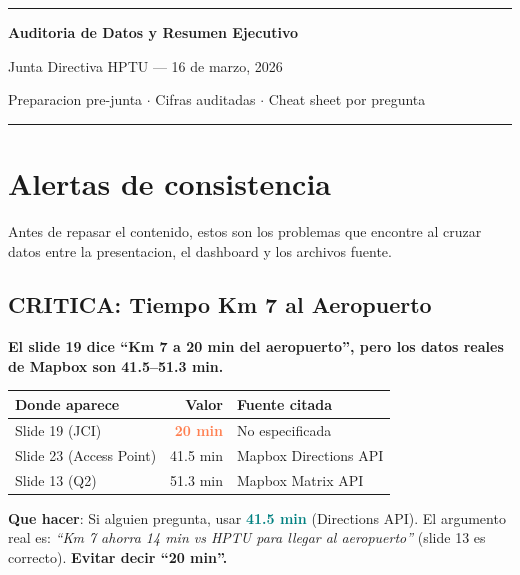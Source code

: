 \documentclass[11pt, a4paper]{article}
\newcommand{\hl}[1]{\textcolor{teal}{\textbf{#1}}}
\newcommand{\dg}[1]{\textcolor{coral}{\textbf{#1}}}
\begin{document}
\begin{center}
{\color{hptu}\rule{\textwidth}{2pt}}

\vspace{12pt}
{\LARGE\bfseries\color{hptu} Auditoria de Datos y Resumen Ejecutivo}

\vspace{4pt}
{\Large Junta Directiva HPTU --- 16 de marzo, 2026}

\vspace{8pt}
{\normalsize\color{slate} Preparacion pre-junta $\cdot$ Cifras auditadas $\cdot$ Cheat sheet por pregunta}

\vspace{8pt}
{\color{hptu}\rule{\textwidth}{2pt}}
\end{center}

\vspace{8pt}

\section{Alertas de consistencia}

Antes de repasar el contenido, estos son los problemas que encontre al cruzar datos entre la presentacion, el dashboard y los archivos fuente.

\subsection{CRITICA: Tiempo Km 7 al Aeropuerto}

\begin{alerta}
\textbf{El slide 19 dice ``Km 7 a 20 min del aeropuerto'', pero los datos reales de Mapbox son 41.5--51.3 min.}

\vspace{4pt}
\begin{tabular}{@{}lrl@{}}
\toprule
\textbf{Donde aparece} & \textbf{Valor} & \textbf{Fuente citada} \\
\midrule
Slide 19 (JCI) & \dg{20 min} & No especificada \\
Slide 23 (Access Point) & 41.5 min & Mapbox Directions API \\
Slide 13 (Q2) & 51.3 min & Mapbox Matrix API \\
\bottomrule
\end{tabular}

\vspace{6pt}
\textbf{Que hacer}: Si alguien pregunta, usar \hl{41.5 min} (Directions API). El argumento real es: \textit{``Km 7 ahorra 14 min vs HPTU para llegar al aeropuerto''} (slide 13 es correcto). \textbf{Evitar decir ``20 min''.}
\end{alerta}
\end{document}
